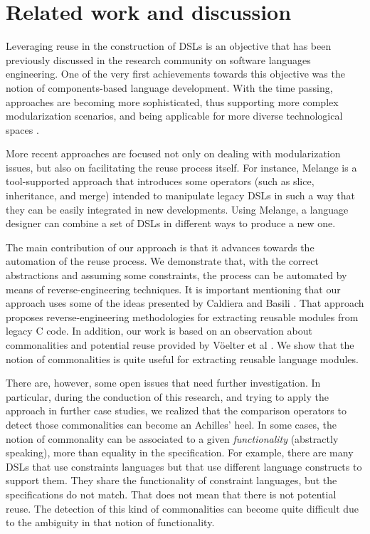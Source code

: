 \section{Related work and discussion}
\label{sec:relatedwork}

Leveraging reuse in the construction of DSLs is an objective that has been previously discussed in the research community on software languages engineering. One of the very first achievements towards this objective was the notion of components-based language development. With the time passing, approaches are becoming more sophisticated, thus supporting more complex modularization scenarios, and being applicable for more diverse technological spaces \cite{Mernik:2013,Rumpe:2010,Voelter:2013b}. 

More recent approaches are focused not only on dealing with modularization issues, but also on facilitating the reuse process itself. For instance, Melange \cite{Degueule:2015} is a tool-supported approach that introduces some operators (such as slice, inheritance, and merge) intended to manipulate legacy DSLs in such a way that they can be easily integrated in new developments. Using Melange, a language designer can combine a set of DSLs in different ways to produce a new one.

The main contribution of our approach is that it advances towards the automation of the reuse process. We demonstrate that, with the correct abstractions and assuming some constraints, the process can be automated by means of reverse-engineering techniques. It is important mentioning that our approach uses some of the ideas presented by Caldiera and Basili \cite{Caldiera:1991}. That approach proposes reverse-engineering methodologies for extracting reusable modules from legacy C code. In addition, our work is based on an observation about commonalities and potential reuse provided by V\"oelter et al \cite[p. 60-61]{voelter:2013}. We show that the notion of commonalities is quite useful for extracting reusable language modules.

There are, however, some open issues that need further investigation. In particular, during the conduction of this research, and trying to apply the approach in further case studies, we realized that the comparison operators to detect those commonalities can become an Achilles' heel. In some cases, the notion of commonality can be associated to a given \textit{functionality} (abstractly speaking), more than equality in the specification. For example, there are many DSLs that use constraints languages but that use different language constructs to support them. They share the functionality of constraint languages, but the specifications do not match. That does not mean that there is not potential reuse. The detection of this kind of commonalities can become quite difficult due to the ambiguity in that notion of functionality.

